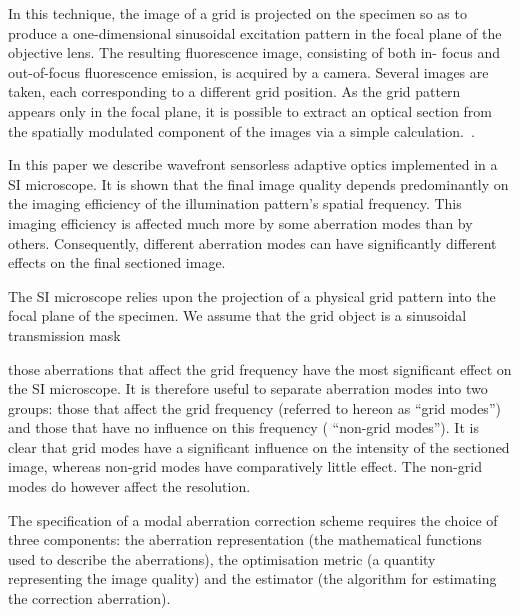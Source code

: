 In this technique, the image of a grid is projected on the specimen so as to 
produce a one-dimensional sinusoidal excitation pattern in the focal plane of 
the objective lens. The resulting fluorescence image, consisting of both in-
focus and out-of-focus fluorescence emission, is acquired by a camera. 
Several images are taken, each corresponding to a different grid position. As 
the grid pattern appears only in the focal plane, it is possible to extract 
an optical section from the spatially modulated component of the images via a 
simple calculation.~\cite{wide_structured_illu_principle}.

In this paper we describe wavefront sensorless adaptive optics implemented in 
a SI microscope. It is shown that the final image quality depends 
predominantly on the imaging efficiency of the illumination pattern’s spatial 
frequency. This imaging efficiency is affected much more by some aberration 
modes than by others. Consequently, different aberration modes can have 
significantly different effects on the final sectioned image.

The SI microscope relies upon the projection of a physical grid pattern into 
the focal plane of the specimen. We assume that the grid object is a 
sinusoidal transmission mask

those aberrations that affect the grid frequency have the most significant 
effect on the SI microscope. It is therefore useful to separate aberration 
modes into two groups: those that affect the grid frequency (referred to 
hereon as “grid modes”) and those that have no influence on this frequency (
“non-grid modes”). It is clear that grid modes have a significant influence 
on the intensity of the sectioned image, whereas non-grid modes have 
comparatively little effect. The non-grid modes do however affect the 
resolution.

The specification of a modal aberration correction scheme requires the choice 
of three components: the aberration representation (the mathematical 
functions used to describe the aberrations), the optimisation metric (a 
quantity representing the image quality) and the estimator (the algorithm for 
estimating the correction aberration).


